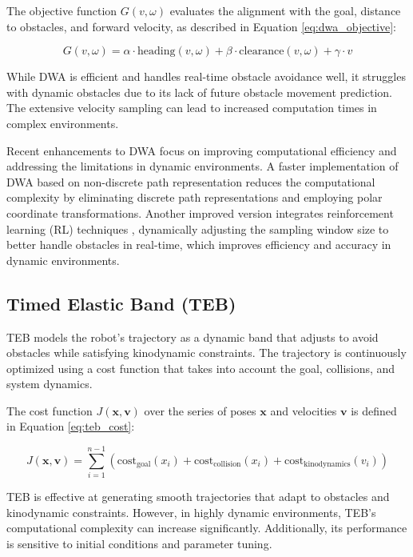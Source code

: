 \documentclass[conference]{IEEEtran}
\begin{document}
The objective function \(G(v, \omega)\) evaluates the alignment with the goal, distance to obstacles, and forward velocity, as described in Equation \eqref{eq:dwa_objective}:

\begin{equation}
\label{eq:dwa_objective}
G(v, \omega) = \alpha \cdot \text{heading}(v, \omega) + \beta \cdot \text{clearance}(v, \omega) + \gamma \cdot v
\end{equation}

While DWA is efficient and handles real-time obstacle avoidance well, it struggles with dynamic obstacles due to its lack of future obstacle movement prediction. The extensive velocity sampling can lead to increased computation times in complex environments.

Recent enhancements to DWA focus on improving computational efficiency and addressing the limitations in dynamic environments. A faster implementation of DWA based on non-discrete path representation \cite{lin2023faster} reduces the computational complexity by eliminating discrete path representations and employing polar coordinate transformations. Another improved version integrates reinforcement learning (RL) techniques \cite{zhou2022improved}, dynamically adjusting the sampling window size to better handle obstacles in real-time, which improves efficiency and accuracy in dynamic environments.

\subsection{Timed Elastic Band (TEB)}
TEB models the robot’s trajectory as a dynamic band that adjusts to avoid obstacles while satisfying kinodynamic constraints. The trajectory is continuously optimized using a cost function that takes into account the goal, collisions, and system dynamics.

The cost function \(J(\mathbf{x}, \mathbf{v})\) over the series of poses \(\mathbf{x}\) and velocities \(\mathbf{v}\) is defined in Equation \eqref{eq:teb_cost}:

\begin{equation}
\label{eq:teb_cost}
J(\mathbf{x}, \mathbf{v}) = \sum_{i=1}^{n-1} \left( \text{cost}_{\text{goal}}(x_i) + \text{cost}_{\text{collision}}(x_i) + \text{cost}_{\text{kinodynamics}}(v_i) \right)
\end{equation}

TEB is effective at generating smooth trajectories that adapt to obstacles and kinodynamic constraints. However, in highly dynamic environments, TEB's computational complexity can increase significantly. Additionally, its performance is sensitive to initial conditions and parameter tuning.
\end{document}
